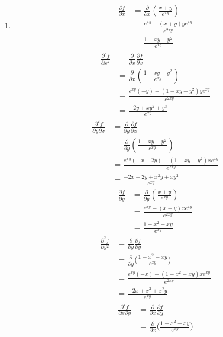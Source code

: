 \begin{enumerate}
 \item
  \begin{align*}
   \frac{\partial f}{\partial x}
   &= \frac{\partial}{\partial x}(\frac{x+y}{e^{xy}}) \\
   &= \frac{e^{xy} - (x+y)ye^{xy}}{e^{2xy}} \\
   &= \frac{1 - xy - y^2}{e^{xy}}
 \end{align*}
 \begin{align*}
   \frac{\partial^2 f}{\partial x^2}
   &= \frac{\partial}{\partial x}\frac{\partial f}{\partial x} \\
   &= \frac{\partial}{\partial x}(\frac{1 - xy - y^2}{e^{xy}}) \\
   &= \frac{e^{xy}(-y) - (1 - xy - y^2)ye^{xy}}{e^{2xy}} \\
   &= \frac{-2y + xy^2 + y^3}{e^{xy}}
 \end{align*}
 \begin{align*}
   \frac{\partial^2 f}{\partial y \partial x}
   &= \frac{\partial}{\partial y}\frac{\partial f}{\partial x} \\
   &= \frac{\partial}{\partial y}(\frac{1 - xy - y^2}{e^{xy}}) \\
   &= \frac{e^{xy}(-x - 2y) - (1 - xy - y^2)xe^{xy}}{e^{2xy}} \\
   &= \frac{-2x - 2y + x^2y + xy^2}{e^{xy}}
 \end{align*}
 \begin{align*}
   \frac{\partial f}{\partial y}
   &= \frac{\partial}{\partial y}(\frac{x+y}{e^{xy}}) \\
   &= \frac{e^{xy} - (x+y)xe^{xy}}{e^{2xy}} \\
   &= \frac{1 - x^2 - xy}{e^{xy}}
 \end{align*}
 \begin{align*}
   \frac{\partial^2 f}{\partial y^2}
   &= \frac{\partial}{\partial y}\frac{\partial f}{\partial y} \\
   &= \frac{\partial}{\partial y}\Big(\frac{1 - x^2 - xy}{e^{xy}}\Big) \\
   &= \frac{e^{xy}(-x) - (1 - x^2 - xy)xe^{xy}}{e^{2xy}} \\
   &= \frac{-2x + x^3 + x^2y}{e^{xy}}
 \end{align*}
 \begin{align*}
   \frac{\partial^2 f}{\partial x \partial y}
   &= \frac{\partial}{\partial x}\frac{\partial f}{\partial y} \\
   &= \frac{\partial}{\partial x}\Big(\frac{1 - x^2 - xy}{e^{xy}}\Big) \\

\end{align*}
\end{enumerate}
